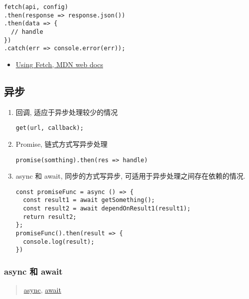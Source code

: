 \begin{lstlisting}
fetch(api, config)
.then(response => response.json())
.then(data => {
  // handle
})
.catch(err => console.error(err));
\end{lstlisting}

\begin{itemize}
\tightlist
\item
  \href{https://developer.mozilla.org/en-US/docs/Web/API/Fetch_API/Using_Fetch}{Using
  Fetch, MDN web docs}
\end{itemize}

\subsection{异步}\label{ux5f02ux6b65}

\begin{enumerate}
\def\labelenumi{\arabic{enumi}.}
\item
  回调, 适应于异步处理较少的情况

\begin{lstlisting}
get(url, callback);
\end{lstlisting}
\item
  Promise, 链式方式写异步处理

\begin{lstlisting}
promise(somthing).then(res => handle)
\end{lstlisting}
\item
  async 和 await, 同步的方式写异步, 可适用于异步处理之间存在依赖的情况.

\begin{lstlisting}
const promiseFunc = async () => {
  const result1 = await getSomething();
  const result2 = await dependOnResult1(result1);
  return result2;
};
promiseFunc().then(result => {
  console.log(result);
})
\end{lstlisting}
\end{enumerate}

\subsubsection{async 和 await}\label{async-ux548c-await}

\begin{quote}
\href{https://developer.mozilla.org/en-US/docs/Web/JavaScript/Reference/Statements/async_function}{async},
\href{https://developer.mozilla.org/en-US/docs/Web/JavaScript/Reference/Operators/await}{await}
\end{quote}

